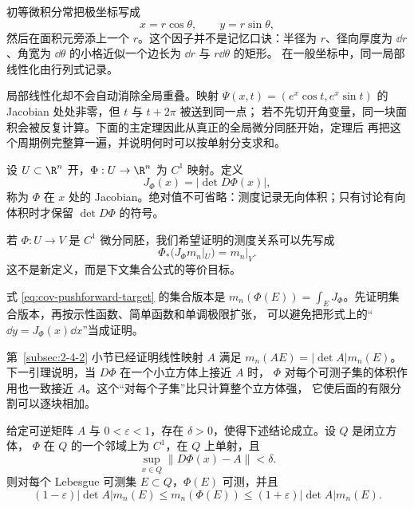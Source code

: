 初等微积分常把极坐标写成
\[
 x=r\cos\theta,\qquad y=r\sin\theta,
\]
然后在面积元旁添上一个 $r$。这个因子并不是记忆口诀：半径为 $r$、径向厚度为
$\dd r$、角宽为 $\dd\theta$ 的小格近似一个边长为 $\dd r$ 与 $r\dd\theta$ 的矩形。
在一般坐标中，同一局部线性化由行列式记录。

局部线性化却不会自动消除全局重叠。映射
$\Psi(x,t)=(e^x\cos t,e^x\sin t)$ 的 Jacobian 处处非零，但 $t$ 与 $t+2\pi$ 被送到同一点；
若不先切开角变量，同一块面积会被反复计算。下面的主定理因此从真正的全局微分同胚开始，定理后
再把这个周期例完整算一遍，并说明何时可以按单射分支求和。

\begin{definition}[Jacobian]\label{def:3-2-2-1}
设 $U\subset\R^n$ 开，$\Phi:U\to\R^n$ 为 $C^1$ 映射。定义
\[
 J_\Phi(x)=|\det D\Phi(x)|,
\]
称为 $\Phi$ 在 $x$ 处的 Jacobian。绝对值不可省略：测度记录无向体积；只有讨论有向体积时才保留
$\det D\Phi$ 的符号。
\end{definition}

若 $\Phi:U\to V$ 是 $C^1$ 微分同胚，我们希望证明的测度关系可以先写成
\[
 \Phi_*\bigl(J_\Phi m_n|_U\bigr)=m_n|_V.
 \tag{3.2.7}\label{eq:cov-pushforward-target}
\]
这不是新定义，而是下文集合公式的等价目标。

\begin{remark}[目标推前关系]\label{def:3-2-2-2}
式 \eqref{eq:cov-pushforward-target} 的集合版本是
$m_n(\Phi(E))=\int_EJ_\Phi$。先证明集合版本，再按示性函数、简单函数和单调极限扩张，
可以避免把形式上的“$\dd y=J_\Phi(x)\dd x$”当成证明。
\end{remark}

第~\ref{subsec:2-4-2} 小节已经证明线性映射 $A$ 满足
$m_n(AE)=|\det A|m_n(E)$。下一引理说明，当 $D\Phi$ 在一个小立方体上接近 $A$ 时，
$\Phi$ 对每个可测子集的体积作用也一致接近 $A$。这个“对每个子集”比只计算整个立方体强，
它使后面的有限分割可以逐块相加。

\begin{lemma}[局部体积估计]\label{lemma:3-2-2-1}
给定可逆矩阵 $A$ 与 $0<\varepsilon<1$，存在 $\delta>0$，使得下述结论成立。设 $Q$ 是闭立方体，
$\Phi$ 在 $Q$ 的一个邻域上为 $C^1$，在 $Q$ 上单射，且
\[
 \sup_{x\in Q}\|D\Phi(x)-A\|<\delta.
\]
则对每个 Lebesgue 可测集 $E\subset Q$，$\Phi(E)$ 可测，并且
\[
 (1-\varepsilon)|\det A|m_n(E)
 \le m_n(\Phi(E))
 \le(1+\varepsilon)|\det A|m_n(E).
 \tag{3.2.8}\label{eq:local-volume-estimate}
\]
\end{lemma}

